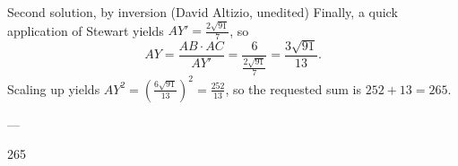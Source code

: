 \begin{customenv}{Second solution, by inversion (David Altizio, unedited)}
    Finally, a quick application of Stewart yields $AY' = \tfrac{2\sqrt{91}}7$, so
    \[
        AY = \frac{AB\cdot AC}{AY'} = \frac{6}{\frac{2\sqrt{91}}7} = \frac{3\sqrt{91}}{13}.
    \]Scaling up yields $AY^2 = (\tfrac{6\sqrt{91}}{13})^2=\tfrac{252}{13}$, so the requested sum is $252+13=265$.
\end{customenv}

---

265
